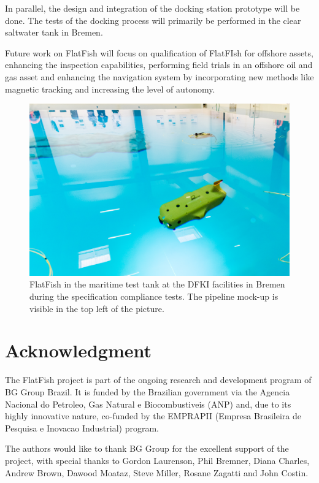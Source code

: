 \documentclass[conference]{IEEEtran}
\begin{document}
In parallel, the design and integration of the docking station prototype will be done. The 
tests of the docking process will primarily be performed in the clear saltwater tank in Bremen.

Future work on FlatFish will focus on qualification of FlatFIsh for offshore assets, enhancing 
the inspection capabilities, performing field trials in an offshore oil and gas asset and enhancing 
the navigation system by incorporating new methods like magnetic tracking 
\cite{christensen2015} and increasing the level of autonomy. 

\begin{figure}[!t]
	\centering
	\includegraphics[width=0.9\columnwidth]{FlatFish-2.jpg}
	\caption{FlatFish in the maritime test tank at the DFKI facilities in Bremen during the 
	specification compliance tests. The pipeline mock-up is visible in the top left of the 
	picture.}
	\label{fig:flatfish2}
\end{figure}

\section*{Acknowledgment}

The FlatFish project is part of the ongoing research and development program of BG Group
Brazil. It is funded by the Brazilian government via the Agencia Nacional do Petroleo, Gas
Natural e Biocombustiveis (ANP) and, due to its highly innovative nature, co-funded by the
EMPRAPII (Empresa Brasileira de Pesquisa e Inovacao Industrial) program. 

The authors would like to thank BG Group for the excellent support of the project, with
special thanks to Gordon Laurenson, Phil Bremner, Diana Charles, Andrew Brown, Dawood 
Moataz, Steve Miller, Rosane Zagatti and John Costin.







\end{document}
